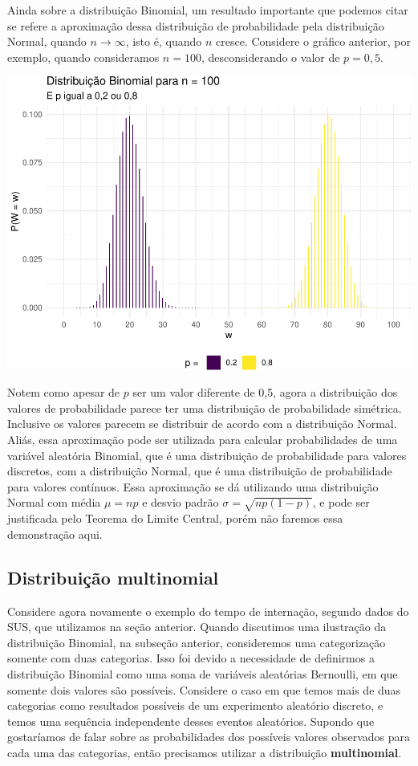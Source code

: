 \documentclass[]{book}
\begin{document}
Ainda sobre a distribuição Binomial, um resultado importante que podemos citar se refere a aproximação dessa distribuição de probabilidade pela distribuição Normal, quando \(n \rightarrow \infty\), isto é, quando \(n\) cresce. Considere o gráfico anterior, por exemplo, quando consideramos \(n = 100\), desconsiderando o valor de \(p = 0,5\).

\begin{center}\includegraphics[width=0.8\linewidth]{notas_livro_files/figure-latex/graf11-1} \end{center}

Notem como apesar de \(p\) ser um valor diferente de 0,5, agora a distribuição dos valores de probabilidade parece ter uma distribuição de probabilidade simétrica. Inclusive os valores parecem se distribuir de acordo com a distribuição Normal. Aliás, essa aproximação pode ser utilizada para calcular probabilidades de uma variável aleatória Binomial, que é uma distribuição de probabilidade para valores discretos, com a distribuição Normal, que é uma distribuição de probabilidade para valores contínuos. Essa aproximação se dá utilizando uma distribuição Normal com média \(\mu = np\) e desvio padrão \(\sigma = \sqrt{np(1-p)}\), e pode ser justificada pelo Teorema do Limite Central, porém não faremos essa demonstração aqui.

\hypertarget{distribuicao-multinomial}{%
\subsection{Distribuição multinomial}\label{distribuicao-multinomial}}

Considere agora novamente o exemplo do tempo de internação, segundo dados do SUS, que utilizamos na seção anterior. Quando discutimos uma ilustração da distribuição Binomial, na subseção anterior, consideremos uma categorização somente com duas categorias. Isso foi devido a necessidade de definirmos a distribuição Binomial como uma soma de variáveis aleatórias Bernoulli, em que somente dois valores são possíveis. Considere o caso em que temos mais de duas categorias como resultados possíveis de um experimento aleatório discreto, e temos uma sequência independente desses eventos aleatórios. Supondo que gostaríamos de falar sobre as probabilidades dos possíveis valores observados para cada uma das categorias, então precisamos utilizar a distribuição \textbf{multinomial}.
\end{document}

